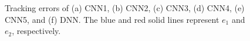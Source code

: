 \documentclass[letterpaper, 10 pt, conference]{ieeeconf}  %
\begin{document}
\begin{figure}
{        \label{fig:CNN5}}
    \hfill
    \caption{Tracking errors of (a) CNN1, (b) CNN2, (c) CNN3, (d) CNN4, (e) CNN5, and (f) DNN. The blue and red solid lines represent $e_1$ and $e_2$, respectively.}
    \label{fig:sim}
\end{figure}
\end{document}
